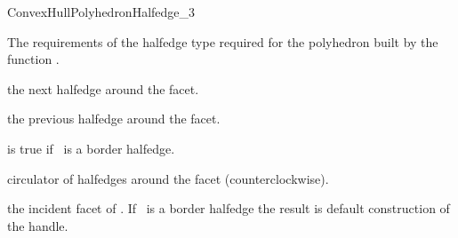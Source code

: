 
\ccRefPageBegin



\begin{ccRefConcept}{ConvexHullPolyhedronHalfedge_3}

\ccDefinition

The requirements of the halfedge type required for the polyhedron built
by the function .
  
\ccHasModels
{}

\ccCreation
{}


\ccTagFullDeclarations
\ccOperations


    {the next halfedge around the facet.}

    {the previous halfedge around the facet.}

    {is true if \ccVar\ is a border halfedge.}


    {circulator of halfedges around the facet (counterclockwise).}



    {the incident facet of \ccVar.  If \ccVar\ is a border halfedge 
      the result is default construction of the handle.}


\ccSeeAlso

 \\
 \\

\ccTagDefaults
\end{ccRefConcept}

\ccRefPageEnd
